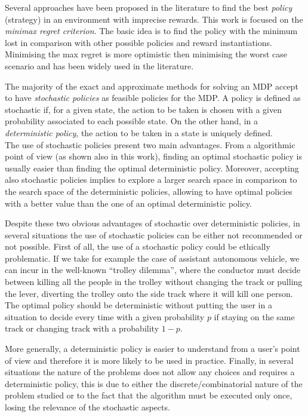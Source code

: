 \documentclass[runningheads,a4paper]{llncs}
\begin{document}
Several approaches have been proposed in the literature to find the best \textit{policy} (strategy) in an environment with imprecise rewards. This work is focused on the \textit{minimax regret criterion}. The basic idea is to find the policy with the minimum lost in comparison with other possible policies and reward instantiations. Minimising the max regret is more optimistic then  minimising the worst case scenario and has been widely used in the literature. %

The majority of the exact and approximate methods for solving an MDP accept to have \textit{stochastic policies} as feasible policies for the MDP. A policy is defined as stochastic if, for a given state, the action to be taken is chosen with a given probability associated to each possible state.
On the other hand, in a \textit{deterministic policy}, the action to be taken in a state is uniquely defined.\\
The use of stochastic policies present two main advantages. From a algorithmic point of view (as shown also in this work), finding an optimal stochastic policy is usually easier than finding the optimal deterministic policy. Moreover, accepting also stochastic policies implies to explore a larger search space in comparison to the search space of the deterministic policies, allowing to have optimal policies with a better value than the one of an optimal deterministic policy.

Despite these two obvious advantages of stochastic over deterministic policies, in several situations the use of stochastic policies can be either not recommended or not possible. 
%
%
First of all, the use of a stochastic policy could be ethically problematic. If we take for example the case of assistant autonomous vehicle, we can incur in the well-known ``trolley dilemma'', where the conductor must decide between killing all the people in the trolley without changing the track or pulling the lever, diverting the trolley onto the side track where it will kill one person. The optimal policy should be deterministic without putting the user in a situation to decide every time with a given probability $p$ if staying on the same track or changing track with a probability $1-p$. 

More generally, a deterministic policy is easier to understand from a user's point of view and therefore it is more likely to be used in practice. Finally, in several situations the nature of the problems does not allow any choices and requires a deterministic policy, this is due to either the discrete/combinatorial nature of the problem studied or to the fact that the algorithm must be executed only once, losing the relevance of the stochastic aspects. 
\end{document}
